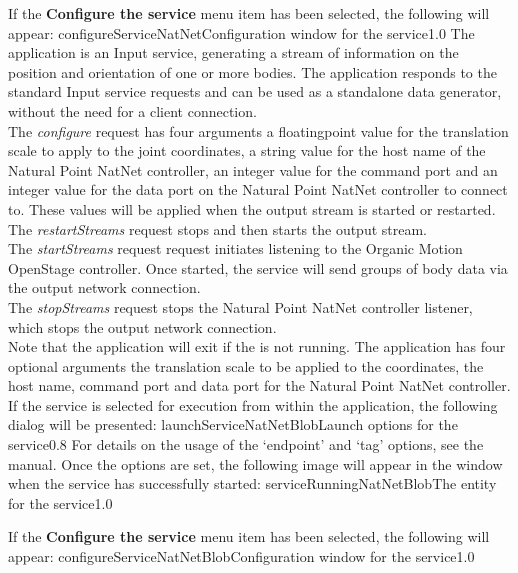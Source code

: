 If the \textbf{Configure the service} menu item has been selected, the following will
appear:
%
{configureServiceNatNet}{Configuration window for the \emph{\NNI} service}{1.0}
\secondaryEnd
\primaryEnd
{}
The  application is an Input service,
generating a stream of information on the position and orientation of one or more bodies.
The application responds to the standard Input service requests and can be used as a
standalone data generator, without the need for a client connection.\\

The \emph{configure} request has four arguments \longDash{} a floating\longDash{}point
value for the translation scale to apply to the joint coordinates, a string value for
the host name of the Natural Point NatNet controller, an integer value for the command
port and an integer value for the data port on the Natural Point NatNet controller to
connect to.
These values will be applied when the output stream is started or restarted.\\ 

The \emph{restartStreams} request stops and then starts the output stream.\\

The \emph{startStreams} request request initiates listening to the Organic Motion
OpenStage controller.
Once started, the service will send groups of body data via the output \yarp{} network
connection.\\

The \emph{stopStreams} request stops the Natural Point NatNet controller listener, which
stops the output \yarp{} network connection.\\ 

Note that the application will exit if the \emph{\RS} is not running.
The application has four optional arguments \longDash{} the translation scale to be
applied to the coordinates, the host name, command port and data port for the Natural
Point NatNet controller.
\insertAppParameters
\insertTagDescription{\NNBI}
\insertInputServiceComment\\

\insertStandardServiceCommands
\secondaryEnd
{}
If the service is selected for execution from within the \emph{\MMMU} application, the
following dialog will be presented:
%
{launchServiceNatNetBlob}{Launch options for the \emph{\NNBI} service}{0.8}
\condPage{}
For details on the usage of the `endpoint' and `tag' options, see the \emph{\MMMU} manual.
Once the options are set, the following image will appear in the \emph{\MMMU} window when
the service has successfully started:
%
{serviceRunningNatNetBlob}{The \emph{\MMMU} entity for the \emph{\NNBI} service}{1.0}

If the \textbf{Configure the service} menu item has been selected, the following will
appear:
%
{configureServiceNatNetBlob}{Configuration window for the \emph{\NNBI} service}{1.0}
\secondaryEnd
\primaryEnd{}
